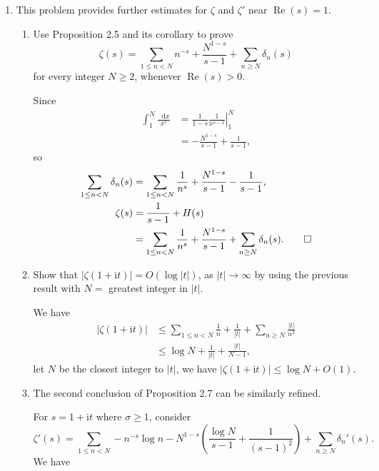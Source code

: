 \documentclass[11pt]{report}
\theoremstyle{mythm}
\let\oldendproof\endproof
\renewenvironment{proof}[1][\proofname]{%
  \oldproof[\normalfont \bfseries #1]%
}{\oldendproof}
\renewcommand*{\proofname}{Proof}
\theoremstyle{myans}
\newcommand{\mi}{\mathrm{i}}
\newcommand{\dd}{\mathop{}\!\mathrm{d}}
\renewcommand{\Re}{\operatorname{Re}}
\begin{document}
\begin{enumerate}
  \item This problem provides further estimates for $\zeta$ and $\zeta'$ near $\Re(s) = 1$.
  \begin{enumerate}
    \item Use Proposition 2.5 and its corollary to prove
    \[ \zeta(s) = \sum_{1\leq n< N} n^{-s} + \frac{N^{1-s}}{s-1}
    + \sum_{n\geq N} \delta_n(s) \]
    for every integer $N \geq 2$, whenever $\Re(s) > 0$.
    \begin{proof}
      Since
      \begin{align*}
        \int_1^N \frac{\dd x}{x^s} &= \left.\frac{1}{1-s} \frac{1}{x^{s-1}} \right|_1^N\\
        &= -\frac{N^{1-s}}{s-1} + \frac1{s-1},
      \end{align*}
      so
      \begin{align*}
        \sum_{1\leq n < N} \delta_n(s) &= \sum_{1\leq n < N} \frac 1{n^s} + \frac{N^{1-s}}{s-1}
        - \frac 1{s-1},\\
        \zeta(s) &= \frac 1{s-1} + H(s)\\
        &= \sum_{1\leq n < N} \frac 1{n^s} + \frac{N^{1-s}}{s-1} + \sum_{n\geq N} \delta_n(s). \qedhere
      \end{align*}
    \end{proof}
    \item Show that $|\zeta(1 + \mi t)| = O(\log |t|)$, as $|t| \to\infty$ by using the previous result
    with $N =$ greatest integer in $|t|$.
    \begin{proof}
      We have
      \begin{align*}
        |\zeta(1 + \mi t)| &\leq \sum_{1\leq n <N} \frac 1 n
        + \frac{1}{|t|} + \sum_{n\geq N} \frac{|t|}{n^2}\\
        &\leq \log N + \frac{1}{|t|} + \frac{|t|}{N-1},
      \end{align*}
      let $N$ be the closest integer to $|t|$, we have
      $|\zeta(1 + \mi t)| \leq \log N + O(1)$.
    \end{proof}
    \item The second conclusion of Proposition 2.7 can be similarly refined.
    \begin{proof}
      For $s = 1 + \mi t$ where $\sigma \geq 1$, consider
      \[ \zeta'(s) = \sum_{1\leq n< N} -n^{-s}\log n
      - N^{1-s}\left(\frac{\log N}{s-1} + \frac 1{(s-1)^2}\right)
      + \sum_{n\geq N} \delta_n'(s). \]
      We have
      \begin{align*}

\end{align*}
\end{proof}
\end{enumerate}
\end{enumerate}
\end{document}
